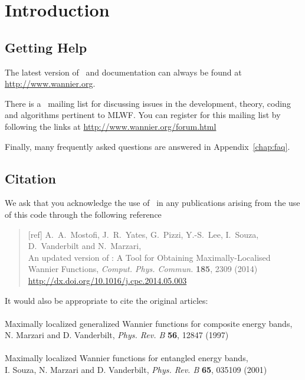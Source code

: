 \chapter*{Introduction}
\section*{Getting Help}
The latest version of \wannier\ and documentation can always
be found at \url{http://www.wannier.org}.

There is a \wannier\ mailing list for discussing issues in the
development, theory, coding and algorithms pertinent to MLWF.
You can register for this mailing list by following the links at
\url{http://www.wannier.org/forum.html}

Finally, many frequently asked questions are answered in
Appendix~\ref{chap:faq}. 

\section*{Citation}
We ask that you acknowledge the use of \wannier\ in any publications
arising from the use of this code through the following reference
\begin{quote}
[ref] A.~A.~Mostofi, J.~R.~Yates, G.~Pizzi, Y.-S.~Lee, I.~Souza, D.~Vanderbilt
and N.~Marzari,\\
An updated version of \wannier: 
A Tool for Obtaining Maximally-Localised Wannier
  Functions, {\it Comput. Phys. Commun.} {\bf 185}, 2309 (2014)\\
\url{http://dx.doi.org/10.1016/j.cpc.2014.05.003}

\end{quote}                                                              

It would also be appropriate to cite the original articles:\\\\
Maximally localized generalized Wannier functions for composite
  energy bands,\\ 
N. Marzari and D. Vanderbilt, {\it Phys. Rev. B} {\bf 56}, 12847 (1997)\\\\
Maximally localized Wannier functions for entangled energy bands,\\
I. Souza, N. Marzari and D. Vanderbilt, {\it Phys. Rev. B} {\bf 65}, 035109 (2001)


